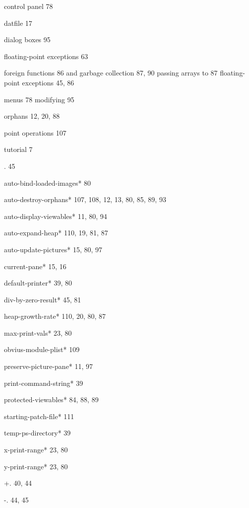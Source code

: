 
\begin{theindex}

\item control panel 78
\item datfile 17
\item dialog boxes 95
\item floating-point exceptions 63
\item foreign functions 86
\subitem  and garbage collection 87, 90
\subitem  passing arrays to 87
\subitem floating-point exceptions 45, 86
\item menus 78
\subitem modifying 95
\item orphans 12, 20, 88
\item point operations 107
\item tutorial 7
\item {\ptt *.} 45
\item {\ptt *auto-bind-loaded-images*} 80
\item {\ptt *auto-destroy-orphans*} 107, 108, 12, 13, 80, 85, 89, 93
\item {\ptt *auto-display-viewables*} 11, 80, 94
\item {\ptt *auto-expand-heap*} 110, 19, 81, 87
\item {\ptt *auto-update-pictures*} 15, 80, 97
\item {\ptt *current-pane*} 15, 16
\item {\ptt *default-printer*} 39, 80
\item {\ptt *div-by-zero-result*} 45, 81
\item {\ptt *heap-growth-rate*} 110, 20, 80, 87
\item {\ptt *max-print-vals*} 23, 80
\item {\ptt *obvius-module-plist*} 109
\item {\ptt *preserve-picture-pane*} 11, 97
\item {\ptt *print-command-string*} 39
\item {\ptt *protected-viewables*} 84, 88, 89
\item {\ptt *starting-patch-file*} 111
\item {\ptt *temp-ps-directory*} 39
\item {\ptt *x-print-range*} 23, 80
\item {\ptt *y-print-range*} 23, 80
\item {\ptt +.} 40, 44
\item {\ptt -.} 44, 45

\end{theindex}
